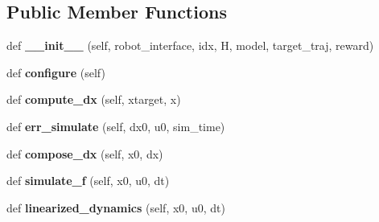 \subsection*{Public Member Functions}
\begin{DoxyCompactItemize}
\item 
\hypertarget{classaml__lfd_1_1lqr_1_1lqr__traj__follow_1_1_l_q_r_traj_follow_a835439060148c7e41a7ab4af17b03c29}{}\label{classaml__lfd_1_1lqr_1_1lqr__traj__follow_1_1_l_q_r_traj_follow_a835439060148c7e41a7ab4af17b03c29} 
def {\bfseries \+\_\+\+\_\+init\+\_\+\+\_\+} (self, robot\+\_\+interface, idx, H, model, target\+\_\+traj, reward)
\item 
\hypertarget{classaml__lfd_1_1lqr_1_1lqr__traj__follow_1_1_l_q_r_traj_follow_ad0a65148a39243fe637f81aa7404f706}{}\label{classaml__lfd_1_1lqr_1_1lqr__traj__follow_1_1_l_q_r_traj_follow_ad0a65148a39243fe637f81aa7404f706} 
def {\bfseries configure} (self)
\item 
\hypertarget{classaml__lfd_1_1lqr_1_1lqr__traj__follow_1_1_l_q_r_traj_follow_aec81ba9d2896a3077a502d5682588c6c}{}\label{classaml__lfd_1_1lqr_1_1lqr__traj__follow_1_1_l_q_r_traj_follow_aec81ba9d2896a3077a502d5682588c6c} 
def {\bfseries compute\+\_\+dx} (self, xtarget, x)
\item 
\hypertarget{classaml__lfd_1_1lqr_1_1lqr__traj__follow_1_1_l_q_r_traj_follow_a7389cb6f7a9fed4bfeaa3b3309c346bc}{}\label{classaml__lfd_1_1lqr_1_1lqr__traj__follow_1_1_l_q_r_traj_follow_a7389cb6f7a9fed4bfeaa3b3309c346bc} 
def {\bfseries err\+\_\+simulate} (self, dx0, u0, sim\+\_\+time)
\item 
\hypertarget{classaml__lfd_1_1lqr_1_1lqr__traj__follow_1_1_l_q_r_traj_follow_a4445d56a038fb396bbc8608f16999235}{}\label{classaml__lfd_1_1lqr_1_1lqr__traj__follow_1_1_l_q_r_traj_follow_a4445d56a038fb396bbc8608f16999235} 
def {\bfseries compose\+\_\+dx} (self, x0, dx)
\item 
\hypertarget{classaml__lfd_1_1lqr_1_1lqr__traj__follow_1_1_l_q_r_traj_follow_a928329e297460a0bbc3a1b8c29ca1a1b}{}\label{classaml__lfd_1_1lqr_1_1lqr__traj__follow_1_1_l_q_r_traj_follow_a928329e297460a0bbc3a1b8c29ca1a1b} 
def {\bfseries simulate\+\_\+f} (self, x0, u0, dt)
\item 
\hypertarget{classaml__lfd_1_1lqr_1_1lqr__traj__follow_1_1_l_q_r_traj_follow_a6f654e3899cc3a186d28b0f02718d729}{}\label{classaml__lfd_1_1lqr_1_1lqr__traj__follow_1_1_l_q_r_traj_follow_a6f654e3899cc3a186d28b0f02718d729} 
def {\bfseries linearized\+\_\+dynamics} (self, x0, u0, dt)
\item 

\end{DoxyCompactItemize}
